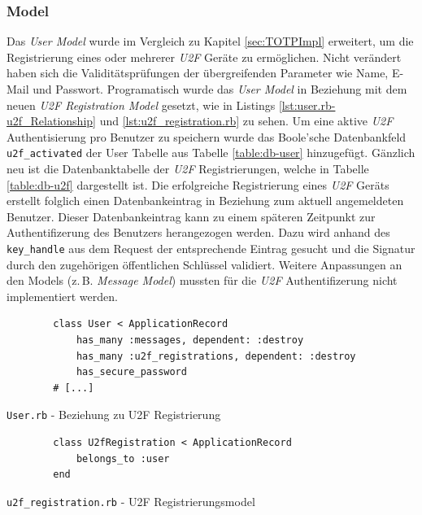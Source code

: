 \documentclass[11pt,a4paper,ngerman]{scrreprt}
\begin{document}
\subsubsection{Model}
Das \textit{User Model} wurde im Vergleich zu Kapitel \ref{sec:TOTPImpl} erweitert, um die Registrierung eines oder mehrerer \textit{U2F} Geräte zu ermöglichen. Nicht verändert haben sich die Validitätsprüfungen der übergreifenden Parameter wie Name, E-Mail und Passwort. Programatisch wurde das \textit{User Model} in Beziehung mit dem neuen \textit{U2F Registration Model} gesetzt, wie in Listings \ref{lst:user.rb-u2f_Relationship} und \ref{lst:u2f_registration.rb} zu sehen. Um eine aktive \textit{U2F} Authentisierung pro Benutzer zu speichern wurde das Boole'sche Datenbankfeld \texttt{u2f\_activated} der User Tabelle aus Tabelle \ref{table:db-user} hinzugefügt. Gänzlich neu ist die Datenbanktabelle der \textit{U2F} Registrierungen, welche in Tabelle \ref{table:db-u2f} dargestellt ist. Die erfolgreiche Registrierung eines \textit{U2F} Geräts erstellt folglich einen Datenbankeintrag in Beziehung zum aktuell angemeldeten Benutzer. Dieser Datenbankeintrag kann zu einem späteren Zeitpunkt zur Authentifizerung des Benutzers herangezogen werden. Dazu wird anhand des \texttt{key\_handle} aus dem Request der entsprechende Eintrag gesucht und die Signatur durch den zugehörigen öffentlichen Schlüssel validiert. Weitere Anpassungen an den Models (z.\,B. \textit{Message Model}) mussten für die \textit{U2F} Authentifizerung nicht implementiert werden. 
\begin{listing}[htpb]
    \begin{verbatim}
        class User < ApplicationRecord
            has_many :messages, dependent: :destroy
            has_many :u2f_registrations, dependent: :destroy
            has_secure_password
        # [...]
    \end{verbatim}
    \caption{\texttt{User.rb} - Beziehung zu U2F Registrierung}
    \label{lst:user.rb-u2f_Relationship}
\end{listing}
\begin{listing}[htpb]
    \begin{verbatim}
        class U2fRegistration < ApplicationRecord
            belongs_to :user
        end
    \end{verbatim}
    \caption{\texttt{u2f\_registration.rb} - U2F Registrierungsmodel}
    \label{lst:u2f_registration.rb}
\end{listing}
\end{document}
